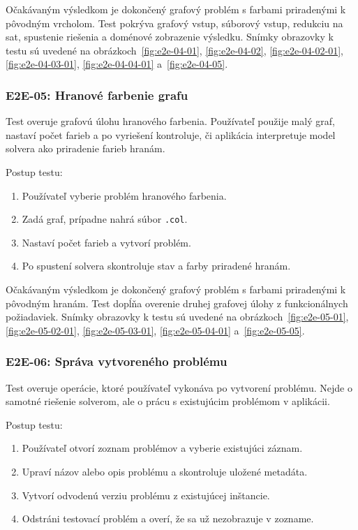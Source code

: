 Očakávaným výsledkom je dokončený grafový problém s farbami priradenými k pôvodným vrcholom. Test pokrýva grafový vstup, súborový vstup, redukciu na \acrshort{sat}, spustenie riešenia a doménové zobrazenie výsledku. Snímky obrazovky k testu sú uvedené na obrázkoch~\ref{fig:e2e-04-01}, \ref{fig:e2e-04-02}, \ref{fig:e2e-04-02-01}, \ref{fig:e2e-04-03-01}, \ref{fig:e2e-04-04-01} a~\ref{fig:e2e-04-05}.

\subsubsection{E2E-05: Hranové farbenie grafu}\label{sec:testing:e2e-05}
Test overuje grafovú úlohu hranového farbenia. Používateľ použije malý graf, nastaví počet farieb a po vyriešení kontroluje, či aplikácia interpretuje model solvera ako priradenie farieb hranám.

Postup testu:
\begin{enumerate}
    \item Používateľ vyberie problém hranového farbenia.
    \item Zadá graf, prípadne nahrá súbor \texttt{.col}.
    \item Nastaví počet farieb a vytvorí problém.
    \item Po spustení solvera skontroluje stav a farby priradené hranám.
\end{enumerate}

Očakávaným výsledkom je dokončený grafový problém s farbami priradenými k pôvodným hranám. Test dopĺňa overenie druhej grafovej úlohy z funkcionálnych požiadaviek. Snímky obrazovky k testu sú uvedené na obrázkoch~\ref{fig:e2e-05-01}, \ref{fig:e2e-05-02-01}, \ref{fig:e2e-05-03-01}, \ref{fig:e2e-05-04-01} a~\ref{fig:e2e-05-05}.

\subsubsection{E2E-06: Správa vytvoreného problému}\label{sec:testing:e2e-06}
Test overuje operácie, ktoré používateľ vykonáva po vytvorení problému. Nejde o samotné riešenie solverom, ale o prácu s existujúcim problémom v aplikácii.

Postup testu:
\begin{enumerate}
    \item Používateľ otvorí zoznam problémov a vyberie existujúci záznam.
    \item Upraví názov alebo opis problému a skontroluje uložené metadáta.
    \item Vytvorí odvodenú verziu problému z existujúcej inštancie.
    \item Odstráni testovací problém a overí, že sa už nezobrazuje v zozname.
\end{enumerate}


